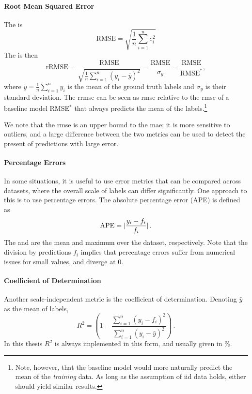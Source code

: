 \paragraph{Root Mean Squared Error}
The  is
\begin{equation}
	\text{RMSE} = \sqrt{\frac{1}{n} \sum_{i=1}^n e_i^2}
\end{equation}
The  is then
\begin{equation}
	\text{rRMSE} = \frac{\text{RMSE}}{\sqrt{ \frac{1}{n} \sum_{i=1}^n (y_i - \bar{y})^2 }}
	= \frac{\text{RMSE}}{\sigma_y}
	= \frac{\text{RMSE}}{\text{RMSE}^{\ast}} ,
\end{equation}
%
where $\bar{y} = \frac{1}{n} \sum_{i=1}^n y_i$ is the mean of the ground truth labels and $\sigma_y$ is their standard deviation.
The \gls{rrmse} can be seen as \gls{rmse} relative to the \gls{rmse} of a baseline model RMSE$^{\ast}$ that always predicts the mean of the labels.\footnote{Note, however, that the baseline model would more naturally predict the mean of the \emph{training} data. As long as the assumption of \gls{iid} data holds, either should yield similar results.}

We note that the \gls{rmse} is an upper bound to the \gls{mae}; it is more sensitive to outliers, and a large difference between the two metrics can be used to detect the present of predictions with large error.

\paragraph{Percentage Errors}
In some situations, it is useful to use error metrics that can be compared across datasets, where the overall scale of labels can differ significantly. One approach to this is to use percentage errors. The absolute percentage error (APE) is defined as
\begin{equation}
	\text{APE} = |\frac{y_i-f_i}{f_i}| \, .
\end{equation}
The  and  are the mean and maximum over the dataset, respectively. Note that the division by predictions $f_i$ implies that percentage errors suffer from numerical issues for small values, and diverge at $0$.

\paragraph{Coefficient of Determination}
Another scale-independent metric is the coefficient of determination. Denoting $\bar{y}$ as the mean of labels,
\begin{equation}
	R^2 = \left(1 - \frac{\sum_{i=1}^n (y_i - f_i)^2}{\sum_{i=1}^n (y_i - \bar{y})^2} \right) \, .
\end{equation}
In this thesis $R^2$ is always implemented in this form, and usually given in \unit{\percent}.



